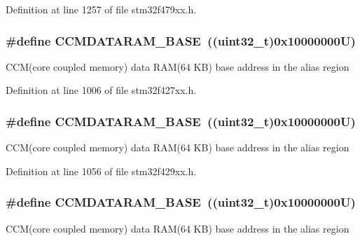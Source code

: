 Definition at line 1257 of file stm32f479xx.\+h.

\subsubsection[{\texorpdfstring{C\+C\+M\+D\+A\+T\+A\+R\+A\+M\+\_\+\+B\+A\+SE}{CCMDATARAM_BASE}}]{\setlength{\rightskip}{0pt plus 5cm}\#define C\+C\+M\+D\+A\+T\+A\+R\+A\+M\+\_\+\+B\+A\+SE~((uint32\+\_\+t)0x10000000\+U)}\hypertarget{group___peripheral__memory__map_gabea1f1810ebeac402164b42ab54bcdf9}{}\label{group___peripheral__memory__map_gabea1f1810ebeac402164b42ab54bcdf9}
C\+C\+M(core coupled memory) data R\+A\+M(64 K\+B) base address in the alias region 

Definition at line 1006 of file stm32f427xx.\+h.

\subsubsection[{\texorpdfstring{C\+C\+M\+D\+A\+T\+A\+R\+A\+M\+\_\+\+B\+A\+SE}{CCMDATARAM_BASE}}]{\setlength{\rightskip}{0pt plus 5cm}\#define C\+C\+M\+D\+A\+T\+A\+R\+A\+M\+\_\+\+B\+A\+SE~((uint32\+\_\+t)0x10000000\+U)}\hypertarget{group___peripheral__memory__map_gabea1f1810ebeac402164b42ab54bcdf9}{}\label{group___peripheral__memory__map_gabea1f1810ebeac402164b42ab54bcdf9}
C\+C\+M(core coupled memory) data R\+A\+M(64 K\+B) base address in the alias region 

Definition at line 1056 of file stm32f429xx.\+h.

\subsubsection[{\texorpdfstring{C\+C\+M\+D\+A\+T\+A\+R\+A\+M\+\_\+\+B\+A\+SE}{CCMDATARAM_BASE}}]{\setlength{\rightskip}{0pt plus 5cm}\#define C\+C\+M\+D\+A\+T\+A\+R\+A\+M\+\_\+\+B\+A\+SE~((uint32\+\_\+t)0x10000000\+U)}\hypertarget{group___peripheral__memory__map_gabea1f1810ebeac402164b42ab54bcdf9}{}\label{group___peripheral__memory__map_gabea1f1810ebeac402164b42ab54bcdf9}
C\+C\+M(core coupled memory) data R\+A\+M(64 K\+B) base address in the alias region 

